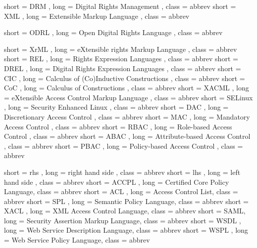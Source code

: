 {
  short = DRM ,
  long  = Digital Rights Management ,
  class = abbrev
}
{
  short = XML ,
  long  = Extensible Markup Language ,
  class = abbrev
}

{
  short = ODRL ,
  long  = Open Digital Rights Language ,
  class = abbrev
}

{
  short = XrML ,
  long  = eXtensible rights Markup Language ,
  class = abbrev
}
{
  short = REL ,
  long  = Rights Expression Languages ,
  class = abbrev
}
{
  short = DREL ,
  long  = Digital Rights Expression Languages ,
  class = abbrev
}
{
  short = CIC ,
  long  = Calculus of (Co)Inductive Constructions ,
  class = abbrev
}
{
  short = CoC ,
  long  = Calculus of Constructions ,
  class = abbrev
}
{
  short = XACML ,
  long  = eXtensible Access Control Markup Language ,
  class = abbrev
}
{
  short = SELinux ,
  long  = Security Enhanced Linux ,
  class = abbrev
}
{
  short = DAC ,
  long  = Discretionary Access Control ,
  class = abbrev
}
{
  short = MAC ,
  long  = Mandatory Access Control ,
  class = abbrev
}
{
  short = RBAC ,
  long  = Role-based Access Control ,
  class = abbrev
}
{
  short = ABAC ,
  long  = Attribute-based Access Control ,
  class = abbrev
}
{
  short = PBAC ,
  long  = Policy-based Access Control ,
  class = abbrev
}

{
  short = rhs ,
  long  = right hand side ,
  class = abbrev
}
{
  short = lhs ,
  long  = left hand side ,
  class = abbrev
}
{
  short = ACCPL ,
  long  =  Certified Core Policy Language,
  class = abbrev
}
{
  short = ACL ,
  long  =  Access Control List,
  class = abbrev
}
{
  short = SPL ,
  long  =  Semantic Policy Language,
  class = abbrev
}
{
  short = XACL ,
  long  =  XML Access Control Language,
  class = abbrev
}
{
  short = SAML,
  long  =  Security Assertion Markup Language,
  class = abbrev
}
{
  short = WSDL ,
  long  =  Web Service Description Language,
  class = abbrev
}
{
  short = WSPL ,
  long  =  Web Service Policy Language,
  class = abbrev
}







